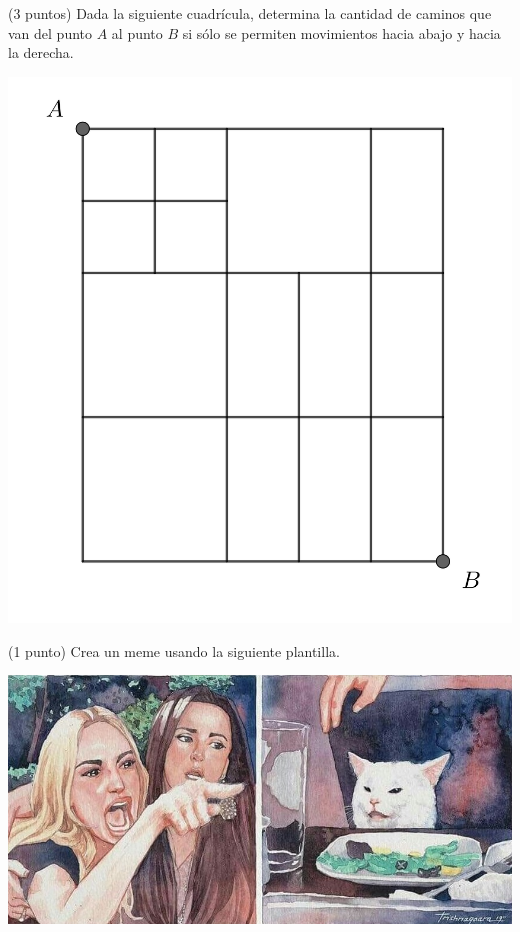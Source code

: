 \begin{problema}
(3 puntos) Dada la siguiente cuadrícula, determina la cantidad de caminos que van del punto $A$ al punto $B$ si sólo se permiten movimientos hacia abajo y hacia la derecha.

\begin{center}
    \includegraphics[scale=0.7]{Imagenes/IMG4/S1C4_Cuadricula.png}
\end{center}

\end{problema} 

\newpage


\begin{problema}
    (1 punto) Crea un meme usando la siguiente plantilla. \vspace{3cm}

        \begin{center}
            \includegraphics[scale=0.7]{Imagenes/IMG4/mujer-gritando-gato-en-la-mesa11567202426.jpg}
        \end{center}

    
\end{problema}\vspace{2cm}


